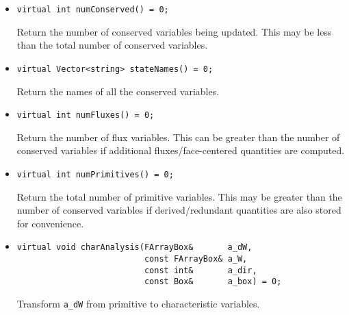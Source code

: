 \begin{itemize}
\item \begin{small}\begin{verbatim}
virtual int numConserved() = 0;
\end{verbatim}\end{small}
Return the number of conserved variables being updated.  This may be less
than the total number of conserved variables.

\item \begin{small}\begin{verbatim}
virtual Vector<string> stateNames() = 0;
\end{verbatim}\end{small}
Return the names of all the conserved variables.

\item \begin{small}\begin{verbatim}
virtual int numFluxes() = 0;
\end{verbatim}\end{small}
Return the number of flux variables.  This can be greater than the number
of conserved variables if additional fluxes/face-centered quantities are
computed.

\item \begin{small}\begin{verbatim}
virtual int numPrimitives() = 0;
\end{verbatim}\end{small}
Return the total number of primitive variables.  This may be greater than
the number of conserved variables if derived/redundant quantities are
also stored for convenience.

\item \begin{small}\begin{verbatim}
virtual void charAnalysis(FArrayBox&       a_dW,
                          const FArrayBox& a_W,
                          const int&       a_dir,
                          const Box&       a_box) = 0;
\end{verbatim}\end{small}
Transform \verb/a_dW/ from primitive to characteristic variables.


\end{itemize}
